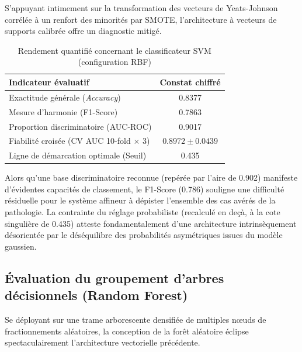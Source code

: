 S'appuyant intimement sur la transformation des vecteurs de Yeats-Johnson corrélée à un renfort des minorités par SMOTE, l'architecture à vecteurs de supports calibrée offre un diagnostic mitigé.

\begin{table}[htbp]
    \centering
    \caption{Rendement quantifié concernant le classificateur SVM (configuration RBF)}
    \label{tab:svm_results}
    \small
    \begin{tabular}{lc}
        \hline
        \textbf{Indicateur évaluatif} & \textbf{Constat chiffré} \\
        \hline
        Exactitude générale (\textit{Accuracy}) & 0.8377 \\
        Mesure d'harmonie (F1-Score) & 0.7863 \\
        Proportion discriminatoire (AUC-ROC) & 0.9017 \\
        Fiabilité croisée (CV AUC 10-fold $\times$ 3) & $0.8972 \pm 0.0439$ \\
        Ligne de démarcation optimale (Seuil) & 0.435 \\
        \hline
    \end{tabular}
\end{table}

Alors qu'une base discriminatoire reconnue (repérée par l'aire de 0.902) manifeste d'évidentes capacités de classement, le F1-Score (0.786) souligne une difficulté résiduelle pour le système affineur à dépister l'ensemble des cas avérés de la pathologie. La contrainte du réglage probabiliste (recalculé en deçà, à la cote singulière de 0.435) atteste fondamentalement d'une architecture intrinsèquement désorientée par le déséquilibre des probabilités asymétriques issues du modèle gaussien.

\subsection{Évaluation du groupement d'arbres décisionnels (Random Forest)}

Se déployant sur une trame arborescente densifiée de multiples nœuds de fractionnements aléatoires, la conception de la forêt aléatoire éclipse spectaculairement l'architecture vectorielle précédente.

